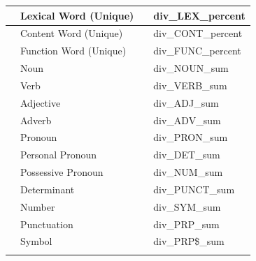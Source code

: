 \documentclass{article}
\begin{document}
\begin{longtable}[c]{| >{\centering\arraybackslash}p{} | >{\centering\arraybackslash}p{} | >{\centering\arraybackslash}p{} | >{\centering\arraybackslash}p{} |}
                                   & Lexical Word (Unique)                &                           & div\_LEX\_percent           \\ \cline{2-2} \cline{4-4} 
                                   & Content Word (Unique)                &                           & div\_CONT\_percent          \\ \cline{2-2} \cline{4-4} 
                                   & Function Word (Unique)               &                           & div\_FUNC\_percent          \\ \hline
\multirow{42}{*}{Quantity}         & Noun                                 & \multirow{18}{*}{Count}   & div\_NOUN\_sum              \\ \cline{2-2} \cline{4-4} 
                                   & Verb                                 &                           & div\_VERB\_sum              \\ \cline{2-2} \cline{4-4} 
                                   & Adjective                            &                           & div\_ADJ\_sum               \\ \cline{2-2} \cline{4-4} 
                                   & Adverb                               &                           & div\_ADV\_sum               \\ \cline{2-2} \cline{4-4} 
                                   & Pronoun                              &                           & div\_PRON\_sum              \\ \cline{2-2} \cline{4-4} 
                                   & Personal Pronoun                     &                           & div\_DET\_sum               \\ \cline{2-2} \cline{4-4} 
                                   & Possessive Pronoun                   &                           & div\_NUM\_sum               \\ \cline{2-2} \cline{4-4} 
                                   & Determinant                          &                           & div\_PUNCT\_sum             \\ \cline{2-2} \cline{4-4} 
                                   & Number                               &                           & div\_SYM\_sum               \\ \cline{2-2} \cline{4-4} 
                                   & Punctuation                          &                           & div\_PRP\_sum               \\ \cline{2-2} \cline{4-4} 
                                   & Symbol                               &                           & div\_PRP\$\_sum             \\ \cline{2-2} \cline{4-4} 

\end{longtable}
\end{document}
